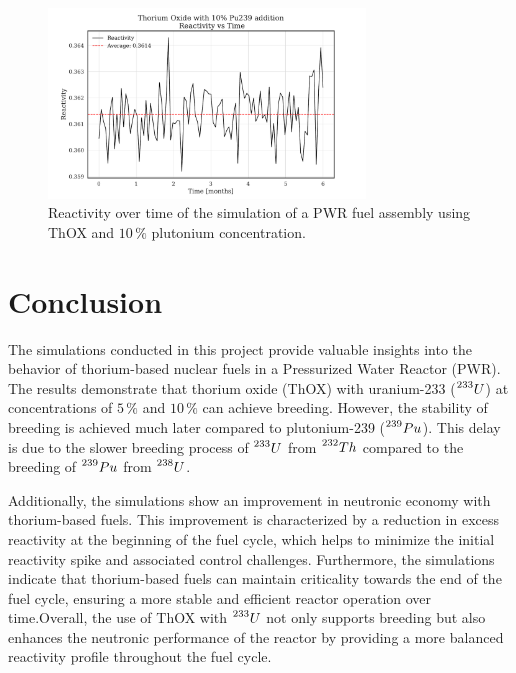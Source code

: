 \begin{figure}[h]
    \centering
    \includegraphics[width=0.75\textwidth, scale = 0.5]{Kap7/Figures_Kap7/Reactivity_vs_Time_ThOX_Pu10.pdf}
    \caption{Reactivity over time of the simulation of a PWR fuel assembly using ThOX and \(10 \, \%\) plutonium concentration.}
    \label{fig:p_th_pu}
\end{figure}

\section{Conclusion}
The simulations conducted in this project provide valuable insights into the behavior of thorium-based nuclear fuels in a Pressurized Water Reactor (PWR). The results demonstrate that thorium oxide (ThOX) with uranium-233 (\(\prescript{233}{}{U}\)) at concentrations of \(5 \, \%\) and \(10 \, \%\) can achieve breeding. However, the stability of breeding is achieved much later compared to plutonium-239 (\(\prescript{239}{}{Pu}\)). This delay is due to the slower breeding process of \(\prescript{233}{}{U}\) from \(\prescript{232}{}{Th}\) compared to the breeding of \(\prescript{239}{}{Pu}\) from \(\prescript{238}{}{U}\).

Additionally, the simulations show an improvement in neutronic economy with thorium-based fuels. This improvement is characterized by a reduction in excess reactivity at the beginning of the fuel cycle, which helps to minimize the initial reactivity spike and associated control challenges. Furthermore, the simulations indicate that thorium-based fuels can maintain criticality towards the end of the fuel cycle, ensuring a more stable and efficient reactor operation over time.Overall, the use of ThOX with \(\prescript{233}{}{U}\) not only supports breeding but also enhances the neutronic performance of the reactor by providing a more balanced reactivity profile throughout the fuel cycle.

